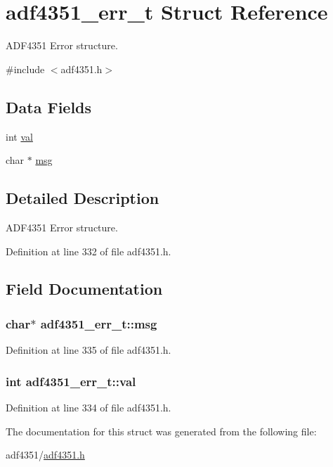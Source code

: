 \hypertarget{structadf4351__err__t}{}\section{adf4351\+\_\+err\+\_\+t Struct Reference}
\label{structadf4351__err__t}


A\+D\+F4351 Error structure.  




{\ttfamily \#include $<$adf4351.\+h$>$}

\subsection*{Data Fields}
\begin{DoxyCompactItemize}
\item 
int \hyperlink{structadf4351__err__t_ab5be0db827951d8d9f360b7b31238d7c}{val}
\item 
char $\ast$ \hyperlink{structadf4351__err__t_abbb87d190201d79e2ca442403d12bd3d}{msg}
\end{DoxyCompactItemize}


\subsection{Detailed Description}
A\+D\+F4351 Error structure. 

Definition at line 332 of file adf4351.\+h.



\subsection{Field Documentation}
\subsubsection[{\texorpdfstring{msg}{msg}}]{\setlength{\rightskip}{0pt plus 5cm}char$\ast$ adf4351\+\_\+err\+\_\+t\+::msg}\hypertarget{structadf4351__err__t_abbb87d190201d79e2ca442403d12bd3d}{}\label{structadf4351__err__t_abbb87d190201d79e2ca442403d12bd3d}


Definition at line 335 of file adf4351.\+h.

\subsubsection[{\texorpdfstring{val}{val}}]{\setlength{\rightskip}{0pt plus 5cm}int adf4351\+\_\+err\+\_\+t\+::val}\hypertarget{structadf4351__err__t_ab5be0db827951d8d9f360b7b31238d7c}{}\label{structadf4351__err__t_ab5be0db827951d8d9f360b7b31238d7c}


Definition at line 334 of file adf4351.\+h.



The documentation for this struct was generated from the following file\+:\begin{DoxyCompactItemize}
\item 
adf4351/\hyperlink{adf4351_8h}{adf4351.\+h}\end{DoxyCompactItemize}
